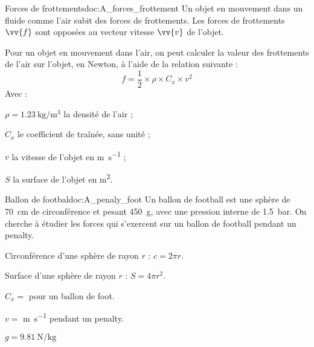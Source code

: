 
\begin{doc}{Forces de frottements}{doc:A_forces_frottement}
  Un objet en mouvement dans un fluide comme l'air subit des forces de frottements.
  Les forces de frottements $\vv{f}$ sont opposées au vecteur vitesse $\vv{v}$ de l'objet.
  
  Pour un objet en mouvement dans l'air, on peut calculer la valeur des frottements de l'air sur l'objet, en Newton, à l'aide de la relation suivante : 
  \begin{equation*}
    f = \dfrac{1}{2} \times \rho \times C_x \times v^2 
  \end{equation*}
  Avec :
  \begin{listePoints}[2]
    \item $\rho = \qty{1,23}{\kg\per\cubic\m}$ la densité de l'air ;
    \item $C_x$ le coefficient de traînée, sans unité ;
    \item $v$ la vitesse de l'objet en \unit{\m\per\s} ;
    \item $S$ la surface de l'objet en \unit{\m\squared}.
  \end{listePoints}
\end{doc}

\begin{doc}{Ballon de footbal}{doc:A_penaly_foot}
  Un ballon de football est une sphère de \qty{70}{\cm} de circonférence et pesant \qty{450}{\g}, avec une pression interne de \qty{1,5}{\bar}.  
  On cherche à étudier les forces qui s'exercent sur un ballon de football pendant un penalty.
  
  \begin{donnees}
    \item Circonférence d'une sphère de rayon $r$ : $c = 2\pi r$.
    \item Surface d'une sphère de rayon $r$ : $S = 4\pi r^2$.
    \item $C_x =$  pour un ballon de foot.
    \item $v =$ \unit{\m\per\s} pendant un penalty.
    \item $g = \qty{9.81}{\newton\per\kg}$
  \end{donnees}
\end{doc}


